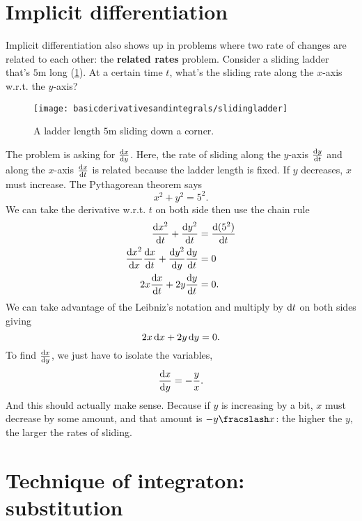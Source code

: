 \section{Implicit differentiation}

Implicit differentiation also shows up in problems where two rate of changes are related to each other: the \textbf{related rates} problem. Consider a sliding ladder that's $5\unit{\meter}$ long (\cref{fig:slidingladder}). At a certain time $t$, what's the sliding rate along the $x$-axis w.r.t. the $y$-axis?

\begin{figure}
    \centering
    \texttt{[image: basicderivativesandintegrals/slidingladder]}
    \caption{A ladder length $5\unit{\meter}$ sliding down a corner.}
    \label{fig:slidingladder}
\end{figure}

The problem is asking for $\odv{x}{y}$. Here, the rate of sliding along the $y$-axis $\odv{y}{t}$ and along the $x$-axis $\odv{x}{t}$ is related because the ladder length is fixed. If $y$ decreases, $x$ must increase. The Pythagorean theorem says
\begin{equation}
    x^2 + y^2 = 5^2.
\end{equation}
We can take the derivative w.r.t. $t$ on both side then use the chain rule
\begin{align*}
    \odv{x^2}{t} + \odv{y^2}{t} &= \odv{(5^2)}{t} \\
    \odv{x^2}{x}\odv{x}{t} + \odv{y^2}{y}\odv{y}{t} &= 0 \\
    2x\odv{x}{t} + 2y\odv{y}{t} &= 0.
\end{align*}
We can take advantage of the Leibniz's notation and multiply by $\odif{t}$ on both sides giving
\begin{equation*}
    2x\odif{x} + 2y\odif{y} = 0.
\end{equation*}
To find $\odv{x}{y}$, we just have to isolate the variables,
\begin{align*}
    \odv{x}{y} = -\frac{y}{x}.
\end{align*}
And this should actually make sense. Because if $y$ is increasing by a bit, $x$ must decrease by some amount, and that amount is $-\flatfrac{y}{x}$: the higher the $y$, the larger the rates of sliding.

\section{Technique of integraton: substitution}

